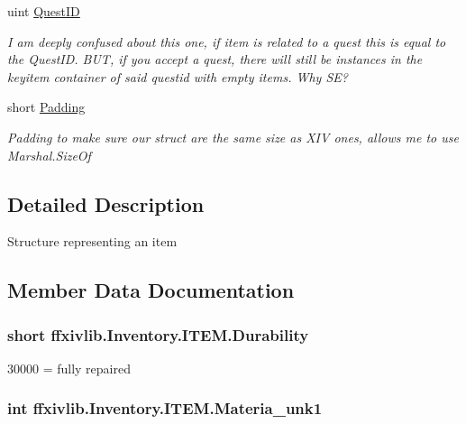\begin{DoxyCompactItemize}
\item 
uint \hyperlink{structffxivlib_1_1_inventory_1_1_i_t_e_m_ac030523cf6f369af9a9be1987df970ef}{Quest\-I\-D}
\begin{DoxyCompactList}\small\item\em I am deeply confused about this one, if item is related to a quest this is equal to the Quest\-I\-D. B\-U\-T, if you accept a quest, there will still be instances in the keyitem container of said questid with empty items. Why S\-E? \end{DoxyCompactList}\item 
short \hyperlink{structffxivlib_1_1_inventory_1_1_i_t_e_m_a634f97f3e65815bdbc434e7ab6da0fb5}{Padding}
\begin{DoxyCompactList}\small\item\em Padding to make sure our struct are the same size as X\-I\-V ones, allows me to use Marshal.\-Size\-Of \end{DoxyCompactList}\end{DoxyCompactItemize}


\subsection{Detailed Description}
Structure representing an item 



\subsection{Member Data Documentation}
\hypertarget{structffxivlib_1_1_inventory_1_1_i_t_e_m_ae3e1f2bfac2b6746e5948e75a5a3b05a}{
\subsubsection[{Durability}]{\setlength{\rightskip}{0pt plus 5cm}short ffxivlib.\-Inventory.\-I\-T\-E\-M.\-Durability}}\label{structffxivlib_1_1_inventory_1_1_i_t_e_m_ae3e1f2bfac2b6746e5948e75a5a3b05a}


30000 = fully repaired 

\hypertarget{structffxivlib_1_1_inventory_1_1_i_t_e_m_aa5184c075480fa32e6c3f7da68811f02}{
\subsubsection[{Materia\-\_\-unk1}]{\setlength{\rightskip}{0pt plus 5cm}int ffxivlib.\-Inventory.\-I\-T\-E\-M.\-Materia\-\_\-unk1}}\label{structffxivlib_1_1_inventory_1_1_i_t_e_m_aa5184c075480fa32e6c3f7da68811f02}


